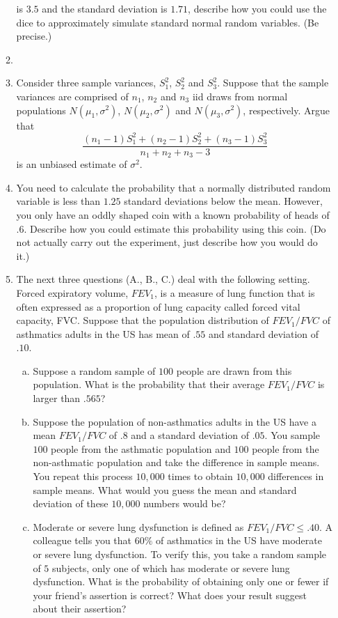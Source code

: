 \documentclass[12pt]{article}
\begin{document}
\begin{enumerate}[1.]
\begin{enumerate}[1.]
  is $3.5$ and the standard deviation is $1.71$, describe how you 
  could use the dice to approximately simulate standard normal random variables. (Be precise.)
\item \item Consider three sample variances, $S_1^2$, $S_2^2$ and
  $S_3^2$. Suppose that the sample variances are comprised of $n_1$,
  $n_2$ and $n_3$ iid draws from normal populations $N(\mu_1,
  \sigma^2)$, $N(\mu_2, \sigma^2)$ and $N(\mu_3, \sigma^2)$, respectively. Argue
  that $$\frac{(n_1 - 1)S_1^2 + (n_2 - 1)S_2^2 + (n_3 - 1) S_3^2}{n_1
    + n_2 + n_3 - 3}$$ is an unbiased estimate of $\sigma^2$.
\item You need to calculate the probability that a normally
  distributed random variable is less than $1.25$ standard deviations
  below the mean. However, you only have an oddly shaped coin with a
  known probability of heads of $.6$. Describe how you could estimate
  this probability using this coin. (Do not actually carry out the
  experiment, just describe how you would do it.)
\item The next three questions (A., B., C.) deal with the following
  setting. Forced expiratory volume, $FEV_1$, is a measure of lung
  function that is often expressed as a proportion of lung capacity
  called forced vital capacity, FVC.  Suppose that the population
  distribution of $FEV_1/FVC$ of asthmatics adults in the US has mean
  of $.55$ and standard deviation of $.10$.
\begin{enumerate}[a.]
\item Suppose a random sample of $100$ people are drawn from this
  population. What is the probability that their average $FEV_1/FVC$ is
  larger than $.565$?
\item Suppose the population of non-asthmatics adults in the US have
  a mean $FEV_1/FVC$ of $.8$ and a standard deviation of $.05$.
  You sample $100$ people from the asthmatic population and
  $100$ people from the non-asthmatic population and take the
  difference in sample means. You repeat this process $10,000$
  times to obtain $10,000$ differences in sample means. What
  would you guess the mean and standard deviation of these
  $10,000$ numbers would be?
\item Moderate or severe lung dysfunction is defined as $FEV_1/FVC
  \leq .40$. A colleague tells you that $60\%$ of asthmatics
  in the US have moderate or severe lung dysfunction. To verify this,
  you take a random sample of $5$ subjects, only one of which has
  moderate or severe lung dysfunction. What is the probability of
  obtaining only one or fewer if your friend's assertion is
  correct? What does your result suggest about their
  assertion? 
\end{enumerate}


\end{enumerate}
\end{enumerate}
\end{document}
